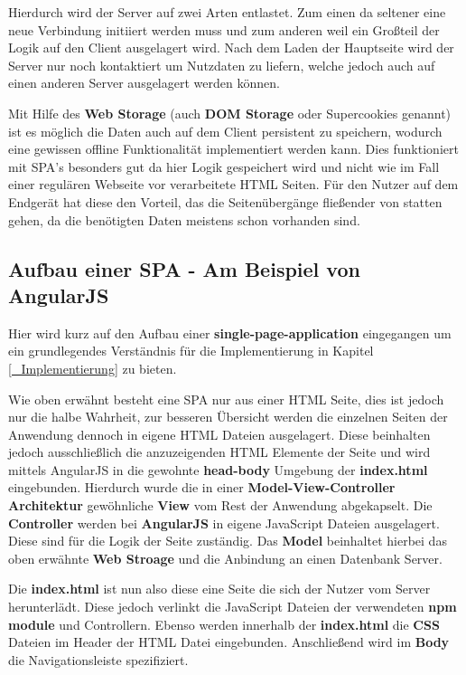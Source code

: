 Hierdurch wird der Server auf zwei Arten entlastet. Zum einen da seltener eine neue Verbindung initiiert werden muss und zum anderen weil ein Großteil der Logik auf den Client ausgelagert wird. Nach dem Laden der Hauptseite wird der Server nur noch kontaktiert um Nutzdaten zu liefern, welche jedoch auch auf einen anderen Server ausgelagert werden können.

Mit Hilfe des \textbf{Web Storage} (auch \textbf{DOM Storage} oder Supercookies genannt) ist es möglich die Daten auch auf dem Client persistent zu speichern, wodurch eine gewissen offline Funktionalität implementiert werden kann. Dies funktioniert mit SPA's besonders gut da hier Logik gespeichert wird und nicht wie im Fall einer regulären Webseite vor verarbeitete HTML Seiten. Für den Nutzer auf dem Endgerät hat diese den Vorteil, das die Seitenübergänge fließender von statten gehen, da die benötigten Daten meistens schon vorhanden sind.

\subsection{Aufbau einer SPA - Am Beispiel von AngularJS}
Hier wird kurz auf den Aufbau einer \textbf{single-page-application} eingegangen um ein grundlegendes Verständnis für die Implementierung in Kapitel \ref{_Implementierung} zu bieten.

Wie oben erwähnt besteht eine SPA nur aus einer HTML Seite, dies ist jedoch nur die halbe Wahrheit, zur besseren Übersicht werden die einzelnen Seiten der Anwendung dennoch in eigene HTML Dateien ausgelagert. Diese beinhalten jedoch ausschließlich die anzuzeigenden HTML Elemente der Seite und wird mittels AngularJS in die gewohnte \textbf{head-body} Umgebung der \textbf{index.html} eingebunden. Hierdurch wurde die in einer \textbf{Model-View-Controller Architektur} gewöhnliche \textbf{View} vom Rest der Anwendung abgekapselt. Die \textbf{Controller} werden bei \textbf{AngularJS} in eigene JavaScript Dateien ausgelagert. Diese sind für die Logik der Seite zuständig. Das \textbf{Model} beinhaltet hierbei das oben erwähnte \textbf{Web Stroage} und die Anbindung an einen Datenbank Server.

Die \textbf{index.html} ist nun also diese eine Seite die sich der Nutzer vom Server herunterlädt. Diese jedoch verlinkt die JavaScript Dateien der verwendeten \textbf{npm module} und Controllern. Ebenso werden innerhalb der \textbf{index.html} die \textbf{CSS} Dateien im Header der HTML Datei eingebunden. Anschließend wird im \textbf{Body} die Navigationsleiste spezifiziert.

